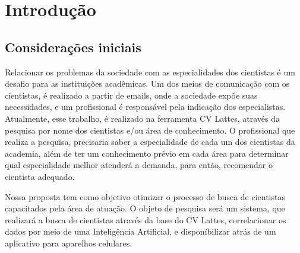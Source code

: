 \chapter{Introdução}\label{cap:introducao}



\section{Considerações iniciais}\label{sec:consideracoesIniciais}


Relacionar os problemas da sociedade com as especialidades dos cientistas é um desafio para as instituições acadêmicas. 
Um dos meios de comunicação com os cientistas, é realizado a partir de emails, onde a sociedade expõe suas necessidades, 
e um profissional é responsável pela indicação dos especialistas. Atualmente, esse trabalho, é realizado 
na ferramenta CV Lattes, através da pesquisa por nome dos cientistas e/ou área de conhecimento. O profissional 
que realiza a pesquisa, precisaria saber a especialidade de cada um dos cientistas da academia, além de ter um conhecimento prévio 
em cada área para determinar qual especialidade melhor atenderá a demanda, para então, recomendar o cientista adequado.

Nossa proposta tem como objetivo otimizar o processo de busca de cientistas capacitados pela área de atuação. O objeto de pesquisa 
será um sistema, que realizará a busca de cientistas através da base do CV Lattes, correlacionar os dados por meio de uma Inteligência 
Artificial, e disponíbilizar atrás de um aplicativo para aparelhos celulares.


